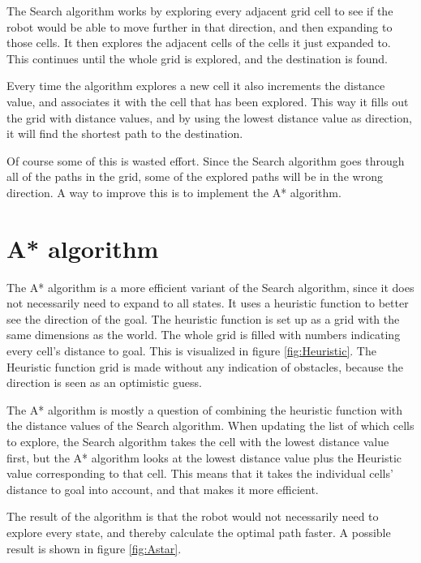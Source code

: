 The Search algorithm works by exploring every adjacent grid cell to see if the robot would be able to move further in that direction, and then expanding to those cells. It then explores the adjacent cells of the cells it just expanded to. This continues until the whole grid is explored, and the destination is found. 

Every time the algorithm explores a new cell it also increments the distance value, and associates it with the cell that has been explored. This way it fills out the grid with distance values, and by using the lowest distance value as direction, it will find the shortest path to the destination. 


Of course some of this is wasted effort. Since the Search algorithm goes through all of the paths in the grid, some of the explored paths will be in the wrong direction. A way to improve this is to implement the A* algorithm.  

\section{A* algorithm}
The A* algorithm is a more efficient variant of the Search algorithm, since it does not necessarily need to expand to all states. It uses a heuristic function to better see the direction of the goal. The heuristic function is set up as a grid with the same dimensions as the world. The whole grid is filled with numbers indicating every cell's distance to goal. This is visualized in figure \ref{fig:Heuristic}. The Heuristic function grid is made without any indication of obstacles, because the direction is seen as an optimistic guess.

The A* algorithm is mostly a question of combining the heuristic function with the distance values of the Search algorithm. When updating the list of which cells to explore, the Search algorithm takes the cell with the lowest distance value first, but the A* algorithm looks at the lowest distance value plus the Heuristic value corresponding to that cell. This means that it takes the individual cells' distance to goal into account, and that makes it more efficient. 

The result of the algorithm is that the robot would not necessarily need to explore every state, and thereby calculate the optimal path faster. A possible result is shown in figure \ref{fig:Astar}.


